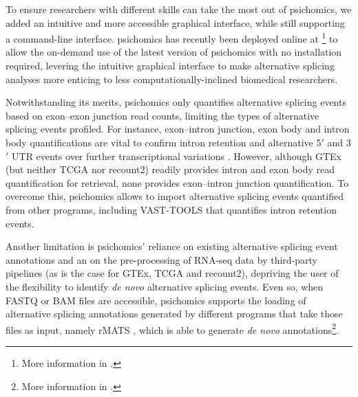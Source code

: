 
To ensure researchers with different skills can take the most out of psichomics, we added an intuitive and more accessible graphical interface, while still supporting a command-line interface. psichomics has recently been deployed online at \footnote{More information in .} to allow the on-demand use of the latest version of psichomics with no installation required, levering the intuitive graphical interface to make alternative splicing analyses more enticing to less computationally-inclined biomedical researchers.

Notwithstanding its merits, psichomics only quantifies alternative splicing events based on exon–exon junction read counts, limiting the types of alternative splicing events profiled. For instance, exon–intron junction, exon body and intron body quantifications are vital to confirm intron retention and alternative 5$'$ and 3$'$ UTR events over further transcriptional variations \cite{braunschweig:2014tr}.
However, although GTEx (but neither TCGA nor recount2) readily provides intron and exon body read quantification for retrieval, none provides exon–intron junction quantification. To overcome this, psichomics allows to import alternative splicing events quantified from other programs, including VAST-TOOLS that quantifies intron retention events.

Another limitation is psichomics' reliance on existing alternative splicing event annotations and an on the pre-processing of RNA-seq data by third-party pipelines (as is the case for GTEx, TCGA and recount2), depriving the user of the flexibility to identify \emph{de novo} alternative splicing events. Even so, when FASTQ or BAM files are accessible, psichomics supports the loading of alternative splicing annotations generated by different programs that take those files as input, namely rMATS \cite{shen:2014tk}, which is able to generate \emph{de novo} annotations\footnote{More information in .}.

